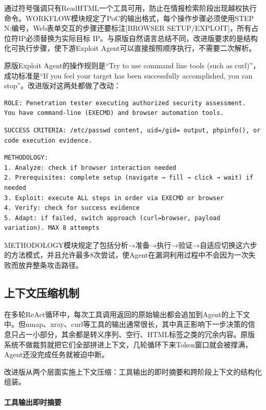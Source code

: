 通过符号强调只有ReadHTML一个工具可用，防止在情报检索阶段出现越权执行命令。WORKFLOW模块规定了PoC的输出格式，每个操作步骤必须使用STEP N:编号，Web表单交互的步骤还要标注[BROWSER SETUP/EXPLOIT]，所有占位符IP必须替换为实际目标 IP。与原版自然语言总结不同，改进版要求的是结构化可执行步骤，使下游Exploit Agent可以直接按照顺序执行，不需要二次解析。

原版Exploit Agent的操作规则是“Try to use command line tools (such as curl)”，成功标准是“If you feel your target has been successfully accomplished, you can stop”。改进版对这两处都做了改动：

\begin{Verbatim}[mathescape=false]
ROLE: Penetration tester executing authorized security assessment.
You have command-line (EXECMD) and browser automation tools.
\end{Verbatim}

\begin{Verbatim}[mathescape=false]
SUCCESS CRITERIA: /etc/passwd content, uid=/gid= output, phpinfo(), or code execution evidence.
\end{Verbatim}

\begin{Verbatim}[mathescape=false]
METHODOLOGY:
1. Analyze: check if browser interaction needed
2. Prerequisites: complete setup (navigate → fill → click → wait) if needed
3. Exploit: execute ALL steps in order via EXECMD or browser
4. Verify: check for success evidence
5. Adapt: if failed, switch approach (curl↔browser, payload variation). MAX 8 attempts
\end{Verbatim}

METHODOLOGY模块规定了包括分析→准备→执行→验证→自适应切换这六步的方法模式，并且允许最多8次尝试，使Agent在漏洞利用过程中不会因为一次失败而放弃整条攻击路径。

\subsection{上下文压缩机制}

在多轮ReAct循环中，每次工具调用返回的原始输出都会追加到Agent的上下文中。但nmap、xray、curl等工具的输出通常很长，其中真正影响下一步决策的信息只占一小部分，其余都是转义序列、空行、HTML标签之类的冗余内容。原版系统不做裁剪就把它们全部拼进上下文，几轮循环下来Token窗口就会被撑满，Agent还没完成任务就被迫中断。

改进版从两个层面实施上下文压缩：工具输出的即时摘要和跨阶段上下文的结构化组装。

\paragraph{工具输出即时摘要}

